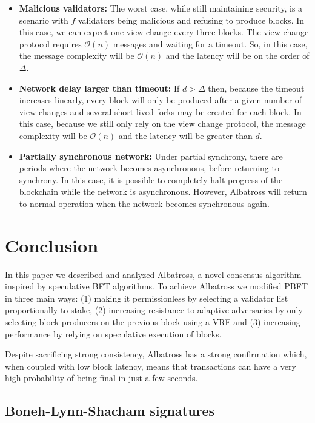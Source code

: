 \documentclass[conference]{IEEEtran}
\begin{document}
\begin{itemize}
	\item \textbf{Malicious validators:} The worst case, while still maintaining security, is a scenario with $f$ validators being malicious and refusing to produce blocks. In this case, we can expect one view change every three blocks. The view change protocol requires $\mathcal{O}(n)$ messages and waiting for a timeout. So, in this case, the message complexity will be $\mathcal{O}(n)$ and the latency will be on the order of $\Delta$.
	\item \textbf{Network delay larger than timeout:} If $d>\Delta$ then, because the timeout increases linearly, every block will only be produced after a given number of view changes and several short-lived forks may be created for each block. In this case, because we still only rely on the view change protocol, the message complexity will be $\mathcal{O}(n)$ and the latency will be greater than $d$.
	\item \textbf{Partially synchronous network:} Under partial synchrony, there are periods where the network becomes asynchronous, before returning to synchrony. In this case, it is possible to completely halt progress of the blockchain while the network is asynchronous. However, Albatross will return to normal operation when the network becomes synchronous again.
\end{itemize}

\section{Conclusion}

In this paper we described and analyzed Albatross, a novel consensus algorithm inspired by speculative BFT algorithms. To achieve Albatross we modified PBFT in three main ways: (1) making it permissionless by selecting a validator list proportionally to stake, (2) increasing resistance to adaptive adversaries by only selecting block producers on the previous block using a VRF and (3) increasing performance by relying on speculative execution of blocks.

Despite sacrificing strong consistency, Albatross has a strong confirmation which, when coupled with low block latency, means that transactions can have a very high probability of being final in just a few seconds.




\appendix
\subsection{Boneh-Lynn-Shacham signatures} \label{bls}
\end{document}
